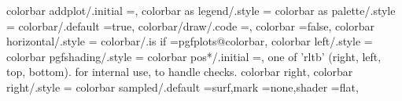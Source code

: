 colorbar addplot/.initial                                          =,                                                                                        
colorbar as legend/.style                                          ={                                                                                                                                  
colorbar as palette/.style                                         ={                                                                                                                                  
colorbar/.default                                                  =true,                                                                                                                              
colorbar/draw/.code                                                ={},                                                                                      
colorbar                                                           =false,                                                                                                                             
colorbar horizontal/.style                                         ={                                                                                                                                 
colorbar/.is if                                                    =pgfplots@colorbar,                                                                                                                 
colorbar left/.style                                               ={                                                                                                                                 
colorbar pgfshading/.style                                         ={                                                                                                                                 
colorbar pos*/.initial                                             =, one of 'rltb' (right, left, top, bottom). for internal use, to handle checks.                                                   
colorbar right,
colorbar right/.style                                              ={                                                                                                                                 
colorbar sampled/.default                                          ={surf,mark                                                                                                                         =none,shader                                               =flat},                                                                                                                   
}}}}}}
